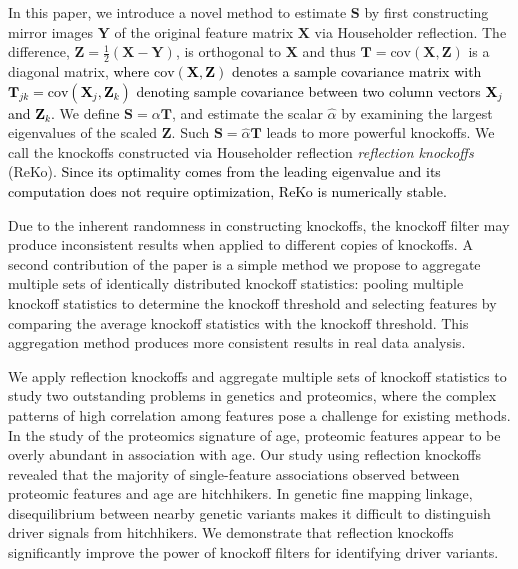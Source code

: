 \documentclass[12pt,Times]{article}
\def\tcb{\textcolor{black}}
\def\T{{\mathbf{T}}}
\def\X{{\mathbf{X}}}
\def\Y{{\mathbf{Y}}}
\def\Z{{\mathbf{Z}}}
\def\S{{\mathbf{S}}}
\def\cov{{\textrm{cov}}}
\begin{document}
In this paper, we introduce a novel method to estimate $\S$ by first constructing mirror images $\Y$ of the original feature matrix $\X$ via Householder reflection. The difference, $\Z=\frac{1}{2}(\X-\Y)$, is orthogonal to $\X$ and thus $\T = \cov(\X, \Z)$ is a diagonal matrix, \tcb{where $\cov(\X,\Z)$ denotes a sample covariance matrix with $\T_{jk} = \cov(\X_j,\Z_k)$ denoting sample covariance between two column vectors $\X_j$ and $\Z_k$.}  We define $\S = \alpha \T$, and estimate the scalar $\hat\alpha$ by examining the largest eigenvalues of the scaled $\Z$.  Such $\S=\hat\alpha \T$ leads to more powerful knockoffs.   We call the knockoffs constructed via Householder reflection \emph{reflection knockoffs} (ReKo).  \tcb{Since its optimality comes from the leading eigenvalue and its computation does not require optimization, ReKo is numerically stable.}

Due to the inherent randomness in constructing knockoffs, the knockoff filter may produce inconsistent results when applied to different copies of knockoffs. A second contribution of the paper is a simple method we propose to aggregate multiple sets of identically distributed knockoff statistics: pooling multiple knockoff statistics to determine the knockoff threshold and selecting features by comparing the average knockoff statistics with the knockoff threshold. This aggregation method produces more consistent results in real data analysis.    


We apply reflection knockoffs and aggregate multiple sets of knockoff statistics to study two outstanding problems in genetics and proteomics, where the complex patterns of high correlation among features pose a challenge for existing methods.  
In the study of the proteomics signature of age, proteomic features appear to be overly abundant in association with age. Our study using reflection knockoffs revealed that the majority of single-feature associations observed between proteomic features and age are hitchhikers.   
In genetic fine mapping linkage, disequilibrium between nearby genetic variants makes it difficult to distinguish driver signals from hitchhikers. We demonstrate that reflection knockoffs significantly improve the power of knockoff filters for identifying driver variants.
\end{document}
